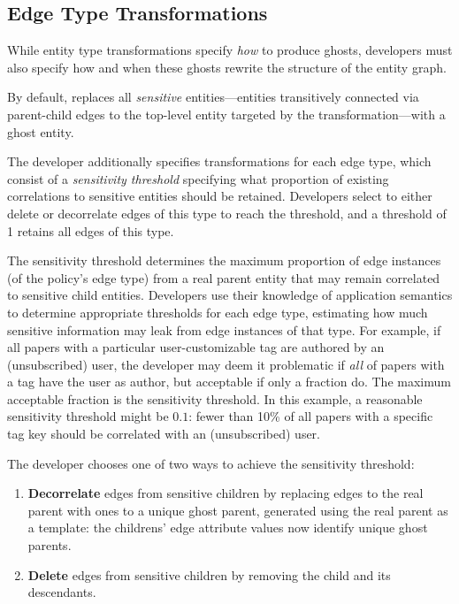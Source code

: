 \subsection{Edge Type Transformations}
\label{design:edgepol}
While entity type transformations specify \emph{how} to produce ghosts, developers must also specify
how and when these ghosts rewrite the structure of the entity graph.  

By default, \sys replaces all \emph{sensitive} entities---entities transitively connected via parent-child edges
to the top-level entity targeted by the transformation---with a ghost entity.  

The developer additionally specifies transformations for each edge type, which consist of a
\emph{sensitivity threshold} specifying what proportion of existing correlations to sensitive
entities should be retained. Developers select to either delete or decorrelate edges of this type to reach
the threshold, and a threshold of 1 retains all edges of this type. 

The sensitivity threshold determines the maximum proportion of edge instances (of the policy's edge
type) from a real parent entity that may remain correlated to sensitive child entities.
Developers use their knowledge of application semantics to determine appropriate thresholds for each
edge type, estimating how much sensitive information may leak from edge instances of that type. 
For example, if all papers with a particular user-customizable tag are authored by an (unsubscribed)
user, the developer may deem it problematic if \emph{all} of papers with a tag have the user as
author, but acceptable if only a fraction do.  The maximum acceptable fraction is the sensitivity
threshold. In this example, a reasonable sensitivity threshold might be $0.1$: fewer than 10\% of all papers with a specific tag key should be correlated with an (unsubscribed) user. 

The developer chooses one of two ways to achieve the sensitivity threshold: 
\begin{enumerate}
    \item \textbf{Decorrelate} edges from sensitive children by replacing edges to the real parent with
        ones to a unique ghost parent, generated using the real parent as a template:
        the childrens' edge attribute values now identify unique ghost parents. 

    \item \textbf{Delete} edges from sensitive children by removing the child and its descendants. 
\end{enumerate}

